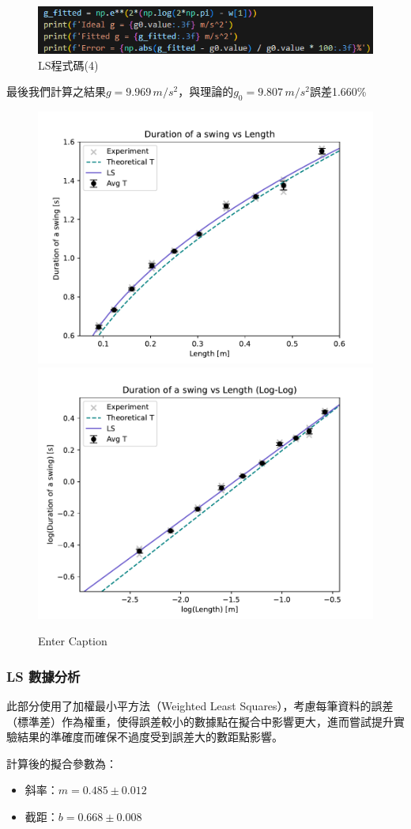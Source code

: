 \documentclass[12pt,a4paper]{article}
\begin{document}
\begin{CJK}{UTF8}{bkai}
\begin{figure}[h]
    \centering
    \includegraphics[width=1\linewidth]{LS4.png}
    \caption{LS程式碼(4)}
    \label{fig:LS4}
\end{figure}

最後我們計算之結果$g=9.969\,m/s^2$，與理論的$g_0=9.807\,m/s^2$誤差1.660\%

\clearpage

\begin{figure}[h]
    \centering
    \includegraphics[width=0.45\linewidth]{ls.pdf}
    \includegraphics[width=0.45\linewidth]{ls_log.pdf}
    \caption{Enter Caption}
    \label{fig:LS}
\end{figure}

\subsubsection{LS 數據分析}
\hfill

此部分使用了加權最小平方法（Weighted Least Squares），考慮每筆資料的誤差（標準差）作為權重，使得誤差較小的數據點在擬合中影響更大，進而嘗試提升實驗結果的準確度而確保不過度受到誤差大的數距點影響。

計算後的擬合參數為：
\begin{itemize}
    \item 斜率：$m=0.485\pm0.012$
    \item 截距：$b=0.668\pm0.008$
\end{itemize}


\end{CJK}
\end{document}
